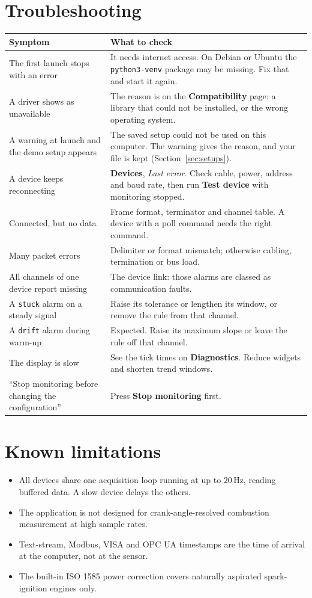 \documentclass[11pt,a4paper]{article}
\newcommand{\ui}[1]{\textbf{#1}}
\newcommand{\key}[1]{\texttt{#1}}
\begin{document}
\section{Troubleshooting}
\begin{longtable}{@{}p{55mm}p{96mm}@{}}\toprule
Symptom & What to check\\\midrule\endhead
The first launch stops with an error & It needs internet access. On Debian or Ubuntu the \key{python3-venv} package may be missing. Fix that and start it again.\\
A driver shows as unavailable & The reason is on the \ui{Compatibility} page: a library that could not be installed, or the wrong operating system.\\
A warning at launch and the demo setup appears & The saved setup could not be used on this computer. The warning gives the reason, and your file is kept (Section~\ref{sec:setups}).\\
A device keeps reconnecting & \ui{Devices}, \emph{Last error}. Check cable, power, address and baud rate, then run \ui{Test device} with monitoring stopped.\\
Connected, but no data & Frame format, terminator and channel table. A device with a poll command needs the right command.\\
Many packet errors & Delimiter or format mismatch; otherwise cabling, termination or bus load.\\
All channels of one device report missing & The device link: those alarms are classed as communication faults.\\
A \key{stuck} alarm on a steady signal & Raise its tolerance or lengthen its window, or remove the rule from that channel.\\
A \key{drift} alarm during warm-up & Expected. Raise its maximum slope or leave the rule off that channel.\\
The display is slow & See the tick times on \ui{Diagnostics}. Reduce widgets and shorten trend windows.\\
``Stop monitoring before changing the configuration'' & Press \ui{Stop monitoring} first.\\\bottomrule
\end{longtable}

\section{Known limitations}
\begin{itemize}
\item All devices share one acquisition loop running at up to 20\,Hz, reading buffered data. A slow device delays the others.
\item The application is not designed for crank-angle-resolved combustion measurement at high sample rates.
\item Text-stream, Modbus, VISA and OPC UA timestamps are the time of arrival at the computer, not at the sensor.
\item The built-in ISO 1585 power correction covers naturally aspirated spark-ignition engines only.
\end{itemize}
\end{document}
